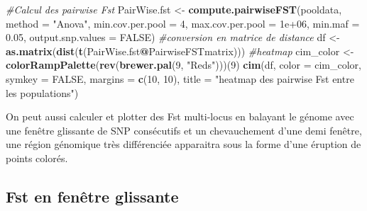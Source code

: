 \documentclass[
  openany]{book}
\newenvironment{Shaded}{\begin{snugshade}}{\end{snugshade}}
\newcommand{\AttributeTok}[1]{\textcolor[rgb]{0.13,0.29,0.53}{#1}}
\newcommand{\CommentTok}[1]{\textcolor[rgb]{0.56,0.35,0.01}{\textit{#1}}}
\newcommand{\ConstantTok}[1]{\textcolor[rgb]{0.56,0.35,0.01}{#1}}
\newcommand{\DecValTok}[1]{\textcolor[rgb]{0.00,0.00,0.81}{#1}}
\newcommand{\FloatTok}[1]{\textcolor[rgb]{0.00,0.00,0.81}{#1}}
\newcommand{\FunctionTok}[1]{\textcolor[rgb]{0.13,0.29,0.53}{\textbf{#1}}}
\newcommand{\NormalTok}[1]{#1}
\newcommand{\OtherTok}[1]{\textcolor[rgb]{0.56,0.35,0.01}{#1}}
\newcommand{\SpecialCharTok}[1]{\textcolor[rgb]{0.81,0.36,0.00}{\textbf{#1}}}
\newcommand{\StringTok}[1]{\textcolor[rgb]{0.31,0.60,0.02}{#1}}
\theoremstyle{definition}
\theoremstyle{definition}
\theoremstyle{definition}
\theoremstyle{definition}
\theoremstyle{remark}
\begin{document}
\begin{Shaded}
\begin{Highlighting}[]
\CommentTok{\#Calcul des pairwise Fst }
\NormalTok{PairWise.fst }\OtherTok{\textless{}{-}} \FunctionTok{compute.pairwiseFST}\NormalTok{(pooldata, }\AttributeTok{method =} \StringTok{"Anova"}\NormalTok{, }\AttributeTok{min.cov.per.pool =} \DecValTok{4}\NormalTok{, }\AttributeTok{max.cov.per.pool =} \FloatTok{1e+06}\NormalTok{, }\AttributeTok{min.maf =} \FloatTok{0.05}\NormalTok{, }\AttributeTok{output.snp.values =} \ConstantTok{FALSE}\NormalTok{)}
\CommentTok{\#conversion en matrice de distance}
\NormalTok{df }\OtherTok{\textless{}{-}} \FunctionTok{as.matrix}\NormalTok{(}\FunctionTok{dist}\NormalTok{(}\FunctionTok{t}\NormalTok{(PairWise.fst}\SpecialCharTok{@}\NormalTok{PairwiseFSTmatrix)))}
\CommentTok{\#heatmap}
\NormalTok{cim\_color }\OtherTok{\textless{}{-}} \FunctionTok{colorRampPalette}\NormalTok{(}\FunctionTok{rev}\NormalTok{(}\FunctionTok{brewer.pal}\NormalTok{(}\DecValTok{9}\NormalTok{, }\StringTok{"Reds"}\NormalTok{)))(}\DecValTok{9}\NormalTok{)}
\FunctionTok{cim}\NormalTok{(df, }\AttributeTok{color =}\NormalTok{ cim\_color, }\AttributeTok{symkey =} \ConstantTok{FALSE}\NormalTok{, }\AttributeTok{margins =} \FunctionTok{c}\NormalTok{(}\DecValTok{10}\NormalTok{, }\DecValTok{10}\NormalTok{),  }\AttributeTok{title =} \StringTok{"heatmap des pairwise Fst entre les populations"}\NormalTok{)}
\end{Highlighting}
\end{Shaded}

On peut aussi calculer et plotter des Fst multi-locus en balayant le génome avec une fenêtre glissante de SNP consécutifs et un chevauchement d'une demi fenêtre, une région génomique très différenciée apparaitra sous la forme d'une éruption de points colorés.

\hypertarget{fst-en-fenuxeatre-glissante}{%
\subsection*{Fst en fenêtre glissante}\label{fst-en-fenuxeatre-glissante}}
\end{document}
